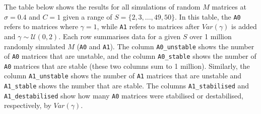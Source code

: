 \documentclass[]{article}
\begin{document}
The table below shows the results for all simulations of random \(M\)
matrices at \(\sigma = 0.4\) and \(C = 1\) given a range of
\(S = \{2, 3, ..., 49, 50\}\). In this table, the \texttt{A0} refers to
matrices where \(\gamma = 1\), while \texttt{A1} refers to matrices
after \(Var(\gamma)\) is added and \(\gamma \sim \mathcal{U}(0, 2)\).
Each row summarises data for a given \(S\) over 1 million randomly
simulated \(M\) (\texttt{A0} and \texttt{A1}). The column
\texttt{A0\_unstable} shows the number of \texttt{A0} matrices that are
unstable, and the column \texttt{A0\_stable} shows the number of
\texttt{A0} matrices that are stable (these two columns sum to 1
million). Similarly, the column \texttt{A1\_unstable} shows the number
of \texttt{A1} matrices that are unstable and \texttt{A1\_stable} shows
the number that are stable. The columns \texttt{A1\_stabilised} and
\texttt{A1\_destabilised} show how many \texttt{A0} matrices were
stabilised or destabilised, respectively, by \(Var(\gamma)\).
\end{document}

